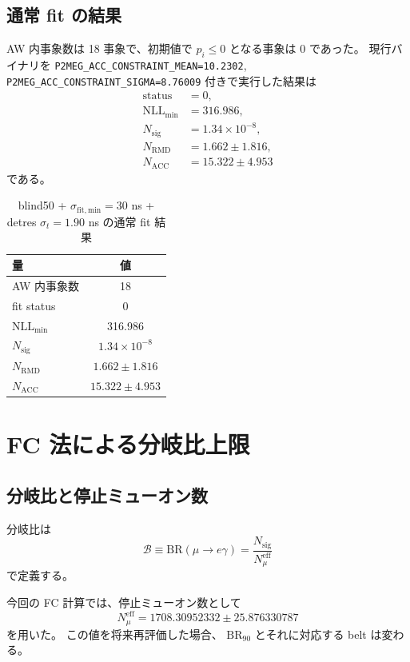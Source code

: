 \documentclass[a4paper,11pt]{jsarticle}
\begin{document}
\subsection{通常 fit の結果}
AW 内事象数は 18 事象で、初期値で \(p_i \le 0\) となる事象は 0 であった。
現行バイナリを
\texttt{P2MEG\_ACC\_CONSTRAINT\_MEAN=10.2302},
\texttt{P2MEG\_ACC\_CONSTRAINT\_SIGMA=8.76009}
付きで実行した結果は
\begin{align}
\mathrm{status} &= 0,\\
\mathrm{NLL}_{\min} &= 316.986,\\
N_{\mathrm{sig}} &= 1.34\times 10^{-8},\\
N_{\mathrm{RMD}} &= 1.662 \pm 1.816,\\
N_{\mathrm{ACC}} &= 15.322 \pm 4.953
\end{align}
である。

\begin{table}[htbp]
\centering
\caption{blind50 + \(\sigma_{\mathrm{fit,min}}=30\) ns + detres \(\sigma_t=1.90\) ns の通常 fit 結果}
\begin{tabular}{lc}
\toprule
量 & 値 \\
\midrule
AW 内事象数 & 18 \\
fit status & 0 \\
\(\mathrm{NLL}_{\min}\) & 316.986 \\
\(N_{\mathrm{sig}}\) & \(1.34\times 10^{-8}\) \\
\(N_{\mathrm{RMD}}\) & \(1.662 \pm 1.816\) \\
\(N_{\mathrm{ACC}}\) & \(15.322 \pm 4.953\) \\
\bottomrule
\end{tabular}
\end{table}

\section{FC 法による分岐比上限}
\subsection{分岐比と停止ミューオン数}
分岐比は
\begin{equation}
\mathcal{B}\equiv \mathrm{BR}(\mu\to e\gamma)
=\frac{N_{\mathrm{sig}}}{N_{\mu}^{\mathrm{eff}}}
\end{equation}
で定義する。

今回の FC 計算では、停止ミューオン数として
\[
N_{\mu}^{\mathrm{eff}} = 1708.30952332 \pm 25.876330787
\]
を用いた。
この値を将来再評価した場合、
\(\mathrm{BR}_{90}\) とそれに対応する belt は変わる。
\end{document}
